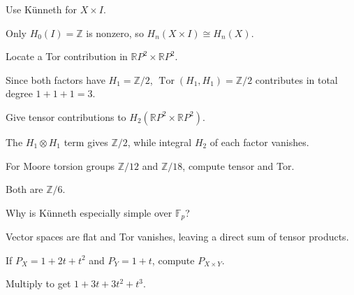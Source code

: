\begin{problem}\label{prob:viii27-07}
Use Künneth for \(X\times I\).
\end{problem}
\begin{solution}
Only \(H_0(I)=\mathbb Z\) is nonzero, so \(H_n(X\times I)\cong H_n(X)\).
\end{solution}

\begin{problem}\label{prob:viii27-08}
Locate a Tor contribution in \(\mathbb RP^2\times\mathbb RP^2\).
\end{problem}
\begin{solution}
Since both factors have \(H_1=\mathbb Z/2\), \(\operatorname{Tor}(H_1,H_1)=\mathbb Z/2\) contributes in total degree \(1+1+1=3\).
\end{solution}

\begin{problem}[RP2 product H2]\label{prob:viii27-09}
Give tensor contributions to \(H_2(\mathbb RP^2\times\mathbb RP^2)\).
\end{problem}
\begin{solution}
The \(H_1\otimes H_1\) term gives \(\mathbb Z/2\), while integral \(H_2\) of each factor vanishes.
\end{solution}

\begin{problem}\label{prob:viii27-10}
For Moore torsion groups \(\mathbb Z/12\) and \(\mathbb Z/18\), compute tensor and Tor.
\end{problem}
\begin{solution}
Both are \(\mathbb Z/6\).
\end{solution}

\begin{problem}\label{prob:viii27-11}
Why is Künneth especially simple over \(\mathbb F_p\)?
\end{problem}
\begin{solution}
Vector spaces are flat and Tor vanishes, leaving a direct sum of tensor products.
\end{solution}

\begin{problem}\label{prob:viii27-12}
If \(P_X=1+2t+t^2\) and \(P_Y=1+t\), compute \(P_{X\times Y}\).
\end{problem}
\begin{solution}
Multiply to get \(1+3t+3t^2+t^3\).
\end{solution}

